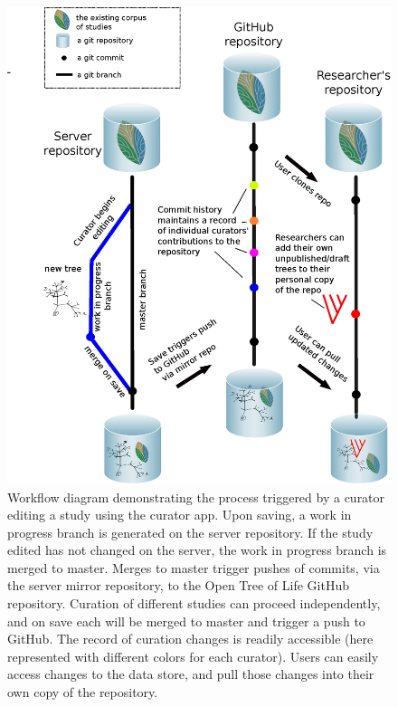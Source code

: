 \documentclass{bioinfo}
\newcommand{\otol}{Open Tree of Life\xspace}
\begin{document}
\begin{figure}
\includegraphics[scale=0.4]{workflow.eps}
 \caption{Workflow diagram demonstrating the process triggered by a curator editing a study using the curator app.
 Upon saving, a work in progress branch is generated on the server repository. 
 If the study edited has not changed on the server, the work in progress branch is merged to master.
 Merges to master trigger pushes of commits, 
 via the server mirror repository, to the \otol GitHub repository.
 Curation of different studies can proceed independently, and on save each will be merged to master and trigger a push to GitHub.
 The record of curation changes is readily accessible (here represented with different colors for each curator).
 Users can easily access changes to the data store, and pull those changes into their own copy of the repository.
 }
\label{workflow}
\end{figure}
\end{document}
